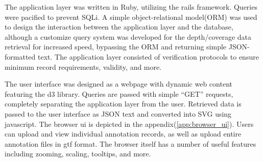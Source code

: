 The application layer was written in Ruby, utilizing the rails framework. Queries were pacified to prevent SQLi. A simple object-relational model(ORM) was used to design the interaction between the application layer and the database, although a customize query system was developed for the depth/coverage data retrieval for increased speed, bypassing the ORM and returning simple JSON-formatted text. The application layer consisted of verification protocols to ensure minimum record requirements, validity, and more.

The user interface was designed as a webpage with dynamic web content featuring the d3 library.\cite{190} Queries are passed with simple ``GET'' requests, completely separating the application layer from the user. Retrieved data is passed to the user interface as JSON text and converted into SVG using javascript. The browser ui is depicted in the appendix(\ref{app:browser_ui}). Users can upload and view individual annotation records, as well as upload entire annotation files in gtf format. The browser itself has a number of useful features including zooming, scaling, tooltips, and more. 